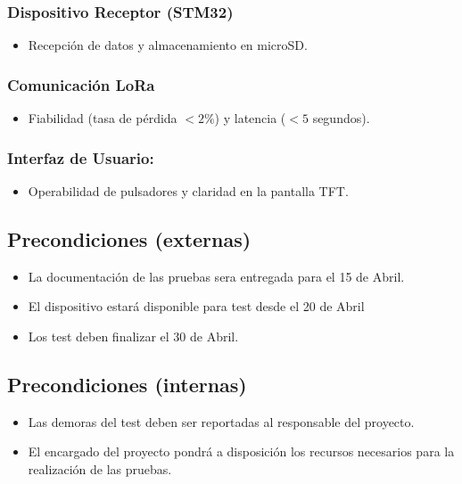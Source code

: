 \documentclass[12pt,a4paper, twosite]{article}
\begin{document}
\subsubsection{Dispositivo Receptor (STM32)}
\begin{itemize}
  \item Recepción de datos y almacenamiento en microSD.
\end{itemize}

\subsubsection{Comunicación LoRa}
\begin{itemize}
  \item Fiabilidad (tasa de pérdida $<2\%$) y latencia ($<5$ segundos).
\end{itemize}

\subsubsection{Interfaz de Usuario:}
\begin{itemize}
  \item Operabilidad de pulsadores y claridad en la pantalla TFT.
\end{itemize}

\subsection{Precondiciones (externas)}
\begin{itemize}
  \item La documentación de las pruebas sera entregada para el 15 de Abril.
  \item El dispositivo estará disponible para test desde el 20 de Abril
  \item Los test deben finalizar el 30 de Abril.
\end{itemize}

\subsection{Precondiciones (internas)}
\begin{itemize}
  \item Las demoras del test deben ser reportadas al responsable del proyecto.
  \item El encargado del proyecto pondrá a disposición los recursos necesarios para la realización de las pruebas.
\end{itemize}
\end{document}
